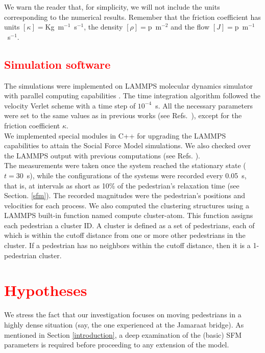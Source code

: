 \documentclass[preprint,12pt]{elsarticle}
\begin{document}
We warn the reader that, for simplicity, we will not include the units 
corresponding to the numerical results. Remember that the friction coefficient 
has units $\left [ \kappa \right]=$Kg~m$^{-1}$~s$^{-1}$, the density $\left [ 
\rho \right]=$p~m$^{-2}$ and the flow $\left [ J \right 
]=$p~m$^{-1}$~s$^{-1}$.\\

\subsection{\label{software}\textcolor{red}{Simulation software}}

The simulations were implemented on LAMMPS molecular dynamics 
simulator with parallel computing capabilities \cite{plimpton}. The time 
integration algorithm followed the velocity Verlet scheme with a time step of 
$10^{-4}$~s. All the necessary parameters were set to the same values as in 
previous works (see Refs.~\cite{Dorso5,sticco}), except for the friction 
coefficient $\kappa$. \\

We implemented special modules in C++ for upgrading the LAMMPS 
capabilities to attain the Social Force Model simulations. We also checked over 
the LAMMPS output with previous computations (see Refs. \cite{Dorso1, 
Dorso2,Dorso3, Dorso4,Dorso6}).\\

The measurements were taken once the system reached the 
stationary state ($t=30$~s), while the configurations of the systems were 
recorded every 0.05~s, that is, at intervals as short as 10\% of the 
pedestrian’s relaxation time (see Section. \ref{sfm}). The recorded magnitudes 
were the pedestrian’s positions and velocities for each process. We also 
computed the clustering structures using a LAMMPS built-in function 
named compute cluster-atom. This function assigns each pedestrian a cluster ID.
A cluster is defined as a set of pedestrians, each of which is within the cutoff
distance from one or more other pedestrians in the cluster. 
If a pedestrian has no neighbors within the cutoff distance, then it is a 1-pedestrian cluster.\\




\section{\label{Hypotheses} \textcolor{red}{Hypotheses}}

We stress the fact that our investigation focuses on moving
pedestrians in a highly dense situation (say, the one experienced at
the Jamaraat bridge). As mentioned in Section \ref{introduction}, a deep
examination of the (basic) SFM parameters is required before
proceeding to any extension of the model.\\
\end{document}
